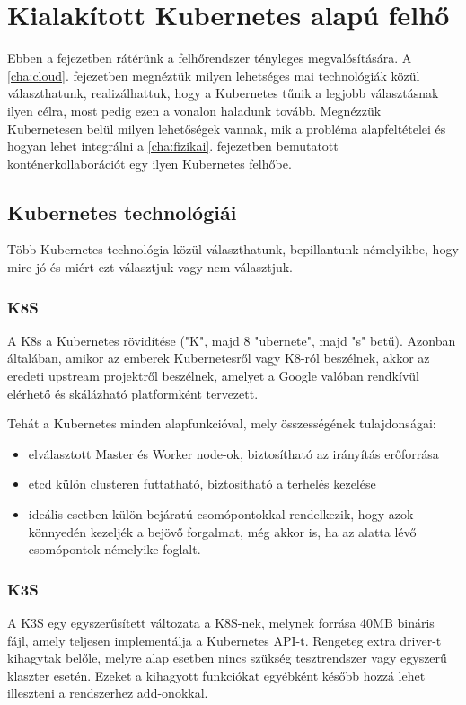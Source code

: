 \chapter{Kialakított Kubernetes alapú felhő}
\label{cha:kubernetes}

Ebben a fejezetben rátérünk a felhőrendszer tényleges megvalósítására. A \ref{cha:cloud}. fejezetben megnéztük milyen lehetséges mai technológiák közül választhatunk, realizálhattuk, hogy a Kubernetes tűnik a legjobb választásnak ilyen célra, most pedig ezen a vonalon haladunk tovább. Megnézzük Kubernetesen belül milyen lehetőségek vannak, mik a probléma alapfeltételei és hogyan lehet integrálni a \ref{cha:fizikai}. fejezetben bemutatott konténerkollaborációt egy ilyen Kubernetes felhőbe.

\section{Kubernetes technológiái}
Több Kubernetes technológia közül választhatunk, bepillantunk némelyikbe, hogy mire jó és miért ezt választjuk vagy nem választjuk.

\subsection{K8S}

A K8s a Kubernetes rövidítése ("K", majd 8 "ubernete", majd "s" betű). Azonban általában, amikor az emberek Kubernetesről vagy K8-ról beszélnek, akkor az eredeti upstream projektről beszélnek, amelyet a Google valóban rendkívül elérhető és skálázható platformként tervezett.

Tehát a Kubernetes minden alapfunkcióval, mely összességének tulajdonságai:
\begin{itemize}
	\item elválasztott Master és Worker node-ok, biztosítható az irányítás erőforrása
	\item etcd külön clusteren futtatható, biztosítható a terhelés kezelése
	\item ideális esetben külön bejáratú csomópontokkal rendelkezik, hogy azok könnyedén kezeljék a bejövő forgalmat, még akkor is, ha az alatta lévő csomópontok némelyike foglalt. \cite{k8svsk3s}
\end{itemize}
\subsection{K3S}
A K3S egy egyszerűsített változata a K8S-nek, melynek forrása 40MB bináris fájl, amely teljesen implementálja a Kubernetes API-t. Rengeteg extra driver-t kihagytak belőle, melyre alap esetben nincs szükség tesztrendszer vagy egyszerű klaszter esetén. Ezeket a kihagyott funkciókat egyébként később hozzá lehet illeszteni a rendszerhez add-onokkal. \cite{k8svsk3s}
